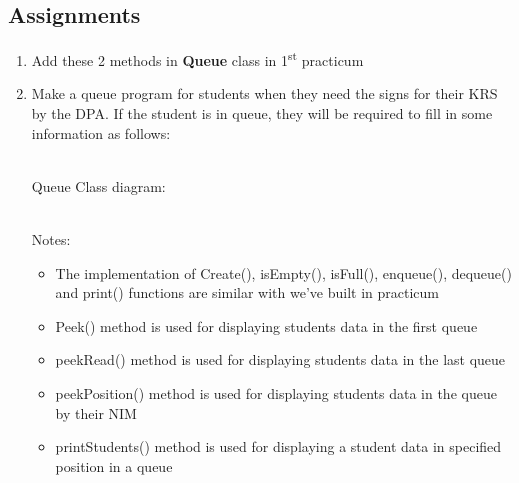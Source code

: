 \documentclass[12pt,titlepage]{article}
\begin{document}
\subsection{Assignments}
\begin{enumerate}
    \item Add these 2 methods in \textbf{Queue} class in 1\textsuperscript{st} practicum
    \item Make a queue program for students when they need the signs for their KRS by the DPA. If the student is in queue, they will be required to fill in some information as follows:
    \mbox{}\\
    \mbox{}\\
    Queue Class diagram:
    \mbox{}\\
    \mbox{}\\
    Notes:
    \begin{itemize}
        \item The implementation of Create(), isEmpty(), isFull(), enqueue(), dequeue() and print() functions are similar with we’ve built in practicum
        \item Peek() method is used for displaying students data in the first queue
        \item peekRead() method is used for displaying students data in the last queue
        \item peekPosition() method is used for displaying students data in the queue by their NIM
        \item printStudents() method is used for displaying a student data in specified position in a queue
    \end{itemize}
\end{enumerate}
\end{document}
